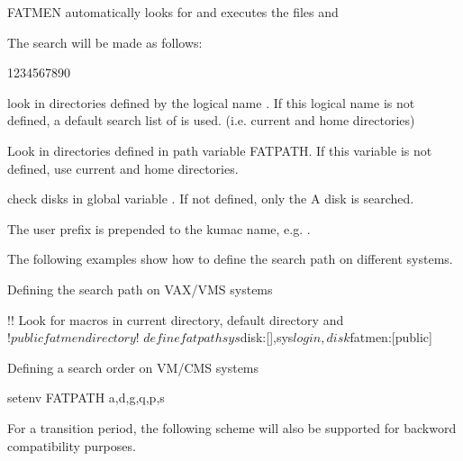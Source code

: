 FATMEN automatically looks for and executes the files
 and 

The search will be made as follows:
\begin{DLtt}{1234567890}
\item[VAX/VMS]look in directories defined by the logical name .
If this logical name is not defined, a default search list of 
 is used. (i.e. current and home directories)
\item[Unix]Look in directories defined in path variable FATPATH.
If this variable is not defined, use current and home directories.
\item[VM/CMS]check disks in global variable . 
If not defined, only the A disk is searched.
\item[MVS]The user prefix is prepended to the kumac name, e.g.
.
\end{DLtt}

The following examples show how to define the search path on different
systems.

\begin{XMPt}{Defining the search path on VAX/VMS systems}

$!
$! Look for macros in current directory, default directory and
$! public fatmen directory
$!
$  define fatpath sys$disk:[],sys$login,disk$fatmen:[public]
\end{XMPt}


\begin{XMPt}{Defining a search order on VM/CMS systems}

setenv FATPATH a,d,g,q,p,s

\end{XMPt}

For a transition period, the following scheme will also be supported
for backword compatibility purposes.

